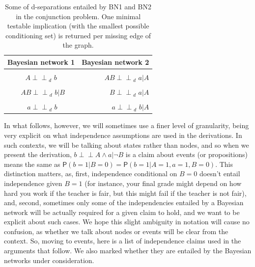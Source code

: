 \documentclass[
  10pt,
  dvipsnames,enabledeprecatedfontcommands]{scrartcl}
\newcommand{\indep}{\!\perp \!\!\! \perp\!}
\newcommand{\n}{\neg}
\newcommand{\et}{\wedge}
\newcommand{\pr}[1]{\ensuremath{\mathsf{P}(#1)}}
\begin{document}
\begin{table}[h]
\begin{tabular}{cr}
\toprule
Bayesian network 1  & Bayesian network 2\\
\midrule
\cellcolor{gray!6}{$A   \indep_d\,\, B  $}&\cellcolor{gray!6}{     $ A  \indep_d\,\, b \vert  B  $} \\
$A   \indep_d\,\, b  $& $AB  \indep_d\,\,  a \vert  A$\\
\cellcolor{gray!6}{$\,\,\, AB  \indep_d\,\, a \vert A $}  & \cellcolor{gray!6}{$AB  \indep_d\,\,  b \vert  B $}\\
$\,\,\, AB  \indep_d\,\, b \vert B  $ & $ B  \indep_d\,\,  a \vert  A $\\
\cellcolor{gray!6}{$B   \indep_d\,\, a $}        & \cellcolor{gray!6}{$a  \indep_d\,\,  b \vert  B$ }\\
$\,\, a    \indep_d\,\, b$    & $a  \indep_d\,\,  b \vert  A $ \\
\bottomrule
\end{tabular}
\caption{Some of d-separations entailed by \textsf{BN1} and \textsf{BN2} in the conjunction problem. One minimal testable implication (with the smallest possible conditioning set) is returned per missing edge of the graph.} 
\label{tab:indepBNS}
\end{table}

In what follows, however, we will sometimes use a finer level of
granularity, being very explicit on what independence assumptions are
used in the derivations. In such contexts, we will be talking about
states rather than nodes, and so when we present the derivation,
\mbox{$b\indep A \et a \vert \n B$} is a claim about events (or
propositions) means the same as
\(\pr{b = 1 \vert B = 0} = \pr{b = 1 \vert A = 1, a = 1, B = 0}\). This
distinction matters, as, first, independence conditional on \(B= 0\)
doesn't entail independence given \(B=1\) (for instance, your final
grade might depend on how hard you work if the teacher is fair, but this
might fail if the teacher is not fair), and, second, sometimes only some
of the independencies entailed by a Bayesian network will be actually
required for a given claim to hold, and we want to be explicit about
such cases. We hope this slight ambiguity in notation will cause no
confusion, as whether we talk about nodes or events will be clear from
the context. So, moving to events, here is a list of independence claims
used in the arguments that follow. We also marked whether they are
entailed by the Bayesian networks under consideration.
\end{document}
